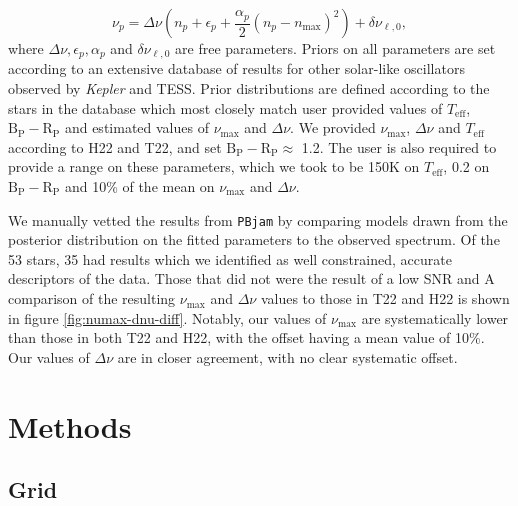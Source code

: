 \documentclass[fleqn,usenatbib]{mnras}
\newcommand{\numax}{\nu_{\mathrm{max}}}
\newcommand{\Dnu}{\Delta\nu}
\newcommand{\Teff}{T_{\mathrm{eff}}}
\begin{document}
\begin{equation}
    \nu_p = \Dnu(n_p + \epsilon_p + \frac{\alpha_p}{2}(n_p - n_{\mathrm{max}})^2) + \delta\nu_{\ell, 0},
\end{equation}
where $\Dnu, \epsilon_p, \alpha_p$ and $\delta \nu_{\ell, 0}$ are free parameters.
Priors on all parameters are set according to an extensive database of results for other solar-like oscillators observed by \textit{Kepler} and TESS. Prior distributions are defined according to the stars in the database which most closely match user provided values of $\Teff$, $\mathrm{B}_\mathrm{P}-\mathrm{R}_{\mathrm{P}}$ and estimated values of $\numax$ and $\Dnu$. We provided $\numax$, $\Dnu$ and $\Teff$ according to H22 and T22, and set $\mathrm{B}_\mathrm{P}-\mathrm{R}_{\mathrm{P}} \approx$ 1.2. The user is also required to provide a range on these parameters, which we took to be 150K on $\Teff$, 0.2 on $\mathrm{B}_\mathrm{P}-\mathrm{R}_{\mathrm{P}}$ and 10\% of the mean on $\numax$ and $\Dnu$. 


We manually vetted the results from \texttt{PBjam} by comparing models drawn from the posterior distribution on the fitted parameters to the observed spectrum. Of the 53 stars, 35 had results which we identified as well constrained, accurate descriptors of the data. Those that did not were the result of a low SNR and  A comparison of the resulting $\numax$ and $\Dnu$ values to those in T22 and H22 is shown in figure \ref{fig:numax-dnu-diff}. Notably, our values of $\numax$ are systematically lower than those in both T22 and H22, with the offset having a mean value of 10\%. Our values of $\Dnu$ are in closer agreement, with no clear systematic offset. 
\section{Methods}
\subsection{Grid}\label{Grid}
\end{document}
